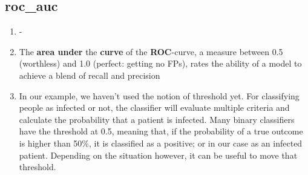 \documentclass[12pt,a4paper]{article}
\begin{document}
\subsection{roc\_auc}
\begin{enumerate}
\item -
\item The \textbf{area under} the \textbf{curve} of the \textbf{ROC}-curve, a measure between 0.5 (worthless) and 1.0 (perfect: getting no FPs), rates the ability of a model to achieve a blend of recall and precision
\item In our example, we haven't used the notion of threshold yet. For classifying people as infected or not, the classifier will evaluate multiple criteria and calculate the probability that a patient is infected. Many binary classifiers have the threshold at 0.5, meaning that, if the probability of a true outcome is higher than 50\%, it is classified as a positive; or in our case as an infected patient. Depending on the situation however, it can be useful to move that threshold.
\end{enumerate}
\end{document}
